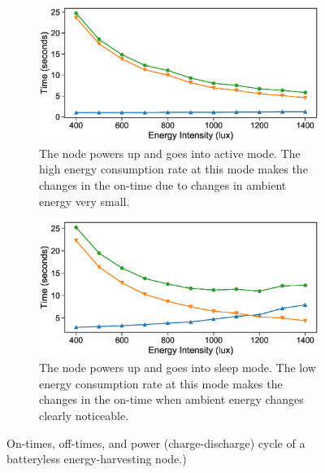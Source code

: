 \begin{figure}

	\begin{subfigure}{0.49\columnwidth}
		\includegraphics[width=\textwidth]{figures/BatterylessNodesDutyCycles_Active_mode}
		\caption{The node powers up and goes into active mode. The high energy consumption rate at this mode makes the changes in the on-time due to changes in ambient energy very small. }
	\end{subfigure}\hfill
	\begin{subfigure}{0.49\columnwidth}
		\includegraphics[width=\textwidth]{figures/BatterylessNodesDutyCycles_Sleep_mode}
		\caption{The node powers up and goes into sleep mode. The low energy consumption rate at this mode makes the changes in the on-time when ambient energy changes clearly noticeable. }
	\end{subfigure}
	\caption{On-times, off-times, and power (charge-discharge) cycle of a batteryless energy-harvesting node.)}
	\label{fig:pwrCycleVSEnergyIntensity}
\end{figure}

